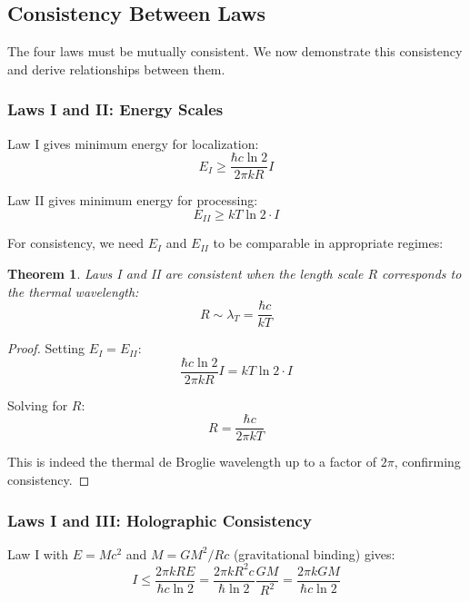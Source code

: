 \documentclass[11pt,a4paper]{article}
\theoremstyle{plain}
\newtheorem{theorem}{Theorem}[section]
\theoremstyle{definition}
\theoremstyle{remark}
\begin{document}
\subsection{Consistency Between Laws}

The four laws must be mutually consistent. We now demonstrate this consistency and derive relationships between them.

\subsubsection{Laws I and II: Energy Scales}

Law I gives minimum energy for localization:
\begin{equation}
E_I \geq \frac{\hbar c\ln 2}{2\pi kR}I
\end{equation}

Law II gives minimum energy for processing:
\begin{equation}
E_{II} \geq kT\ln 2\cdot I
\end{equation}

For consistency, we need $E_I$ and $E_{II}$ to be comparable in appropriate regimes:

\begin{theorem}
Laws I and II are consistent when the length scale $R$ corresponds to the thermal wavelength:
\begin{equation}
R \sim \lambda_T = \frac{\hbar c}{kT}
\end{equation}
\end{theorem}

\begin{proof}
Setting $E_I = E_{II}$:
\begin{equation}
\frac{\hbar c\ln 2}{2\pi kR}I = kT\ln 2\cdot I
\end{equation}

Solving for $R$:
\begin{equation}
R = \frac{\hbar c}{2\pi kT}
\end{equation}

This is indeed the thermal de Broglie wavelength up to a factor of $2\pi$, confirming consistency.
\end{proof}

\subsubsection{Laws I and III: Holographic Consistency}

Law I with $E=Mc^2$ and $M = GM^2/Rc$ (gravitational binding) gives:
\begin{equation}
I \leq \frac{2\pi kRE}{\hbar c\ln 2} = \frac{2\pi kR^2c}{\hbar\ln 2}\frac{GM}{R^2} = \frac{2\pi kGM}{\hbar c\ln 2}
\end{equation}
\end{document}
